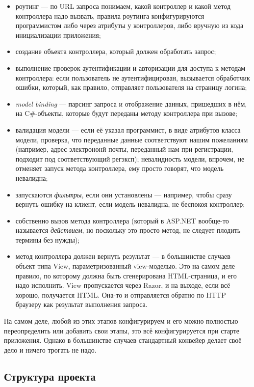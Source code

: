 \documentclass[a5paper]{article}
\begin{document}
\begin{itemize}
    \item роутинг --- по URL запроса понимаем, какой контроллер и какой метод контроллера надо вызвать, правила роутинга конфигурируются программистом либо через атрибуты у контроллеров, либо вручную из кода инициализации приложения;
    \item создание объекта контроллера, который должен обработать запрос;
    \item выполнение проверок аутентификации и авторизации для доступа к методам контроллера: если пользователь не аутентифицирован, вызывается обработчик ошибки, который, как правило, отправляет пользователя на страницу логина;
    \item \emph{model binding} --- парсинг запроса и отображение данных, пришедших в нём, на C\#-объекты, которые будут переданы методу контроллера при вызове;
    \item валидация модели --- если её указал программист, в виде атрибутов класса модели, проверка, что переданные данные соответствуют нашим пожеланиям (например, адрес электрононй почты, переданный нам при регистрации, подходит под соответствующий регэксп); невалидность модели, впрочем, не отменяет запуск метода контроллера, ему просто говорят, что модель невалидна;
    \item запускаются \emph{фильтры}, если они установлены --- например, чтобы сразу вернуть ошибку на клиент, если модель невалидна, не беспокоя контроллер;
    \item собственно вызов метода контроллера (который в ASP.NET вообще-то называется \emph{действием}, но поскольку это просто метод, не следует плодить термины без нужды);
    \item метод контроллера должен вернуть результат --- в большинстве случаев объект типа View, параметризованный view-моделью. Это на самом деле правило, по которому должна быть сгенерирована HTML-страница, и его надо исполнить. View пропускается через Razor, и на выходе, если всё хорошо, получается HTML. Она-то и отправляется обратно по HTTP браузеру как результат выполнения запроса.
\end{itemize}

На самом деле, любой из этих этапов конфигурируем и его можно полностью переопределить или добавить свои этапы, это всё конфигурируется при старте приложения. Однако в большинстве случаев стандартный конвейер делает своё дело и ничего трогать не надо.

\subsection{Структура проекта}
\end{document}
